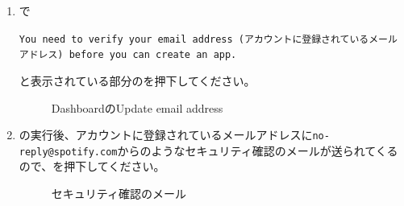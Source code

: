 \begin{enumerate}
                \item \spotifydashboard で
                    \begin{screen}
                        \texttt{You need to verify your email address (アカウントに登録されているメールアドレス) before you can create an app.}
                    \end{screen}
                    と表示されている部分のを押下してください。
                \label{item:spotify3}
                    \begin{figure}[htbp]
                        \centering
                        \caption{DashboardのUpdate email address}
                        \label{img:spotify2}
                    \end{figure}

                \newpage
                \item {}の実行後、アカウントに登録されているメールアドレスに\texttt{no-reply@spotify.com}からのようなセキュリティ確認のメールが送られてくるので、を押下してください。
                \label{item:spotify4}
                    \begin{figure}[htbp]
                        \centering
                        \caption{セキュリティ確認のメール}
                        \label{img:spotify3}
                    \end{figure}


\end{enumerate}
